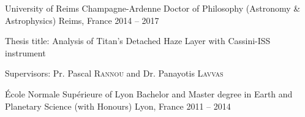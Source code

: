 
\begin{cventries}

  \cventry
    {University of Reims Champagne-Ardenne}
    {Doctor of Philosophy (Astronomy \& Astrophysics)}
    {Reims, France}
    {2014 -- 2017}
    {
      \begin{cvitems}
        \item{Thesis title: Analysis of Titan’s Detached Haze Layer with Cassini-ISS instrument}
        \item{Supervisors: Pr. Pascal \textsc{Rannou} and Dr. Panayotis \textsc{Lavvas}}
      \end{cvitems}
      \vspace{1em}
    }

  \cventry
    {École Normale Supérieure of Lyon}
    {Bachelor and Master degree in Earth and Planetary Science (with Honours)}
    {Lyon, France}
    {2011 -- 2014}
    {}

\end{cventries}
